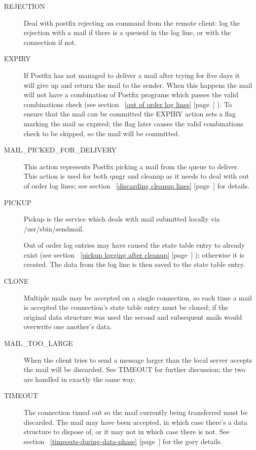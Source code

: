 \documentclass[a4paper,12pt,draft]{article}
\newcommand{\refwithpage}[1]{%
    \empty{}\ref{#1} [page~\pageref{#1}]%
}
\begin{document}
\begin{description}
    \item [REJECTION] Deal with postfix rejecting an \SMTP{} command from
        the remote client: log the rejection with a mail if there is a
        queueid in the log line, or with the connection if not.

    \item [EXPIRY] If Postfix has not managed to deliver a mail after
        trying for five days it will give up and return the mail to the
        sender.  When this happens the mail will not have a combination of
        Postfix programs which passes the valid combinations check (see
        section~\refwithpage{out of order log lines}).  To ensure that the
        mail can be committed the EXPIRY action sets a flag marking the
        mail as expired; the flag later causes the valid combinations check
        to be skipped, so the mail will be committed.

    \item [MAIL\_PICKED\_FOR\_DELIVERY] This action represents Postfix
        picking a mail from the queue to deliver. This action is used for
        both qmgr and cleanup as it needs to deal with out of order log
        lines; see section~\refwithpage{discarding cleanup lines} for
        details.

    \item [PICKUP] Pickup is the service which deals with mail submitted
        locally via /usr/sbin/sendmail. 

        Out of order log entries may have caused the state table entry to
        already exist (see section~\refwithpage{pickup logging after
        cleanup}); otherwise it is created.  The data from the log line is
        then saved to the state table entry.

    \item [CLONE] Multiple mails may be accepted on a single connection, so
        each time a mail is accepted the connection's state table entry
        must be cloned; if the original data structure was used the second
        and subsequent mails would overwrite one another's data.

    \item [MAIL\_TOO\_LARGE] When the client tries to send a message larger
        than the local server accepts the mail will be discarded.  See
        TIMEOUT for further discussion; the two are handled in exactly the
        same way.

    \item [TIMEOUT] The connection timed out so the mail currently being
        transferred must be discarded. The mail may have been accepted, in
        which case there's a data structure to dispose of, or it may not in
        which case there is not.  See
        section~\refwithpage{timeouts-during-data-phase} for the gory
        details.


\end{description}
\end{document}
